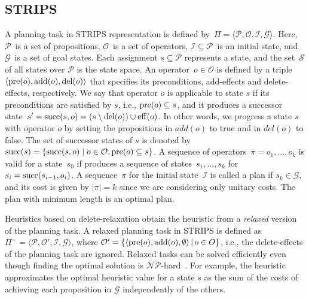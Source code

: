 \documentclass[ppgc,diss,english]{iiufrgs}
\begin{document}
\subsection{STRIPS}
\label{sec:background-strips}
A planning task in STRIPS representation is defined by~$\Pi=\langle\mathcal{P},\mathcal{O},\mathcal{I},\mathcal{G}\rangle$. Here, $\mathcal{P}$~is a set of propositions, $\mathcal{O}$~is a set of operators, $\mathcal{I} \subseteq \mathcal{P}$~is an initial state, and $\mathcal{G}$~is a set of goal states. Each assignment $s \subseteq \mathcal{P}$ represents a state, and the set~$\mathcal{S}$ of all states over $\mathcal{P}$ is the state space.
An operator~$o \in \mathcal{O}$ is defined by a triple~$\langle\operatorname{pre}(o),\operatorname{add}(o),\operatorname{del}(o)\rangle$ that specifies its preconditions, add-effects and delete-effects, respectively. We say that operator $o$ is applicable to state $s$ if its preconditions are satisfied by $s$, i.e., $\operatorname{pre}(o) \subseteq s$, and it produces a successor state~$s' = \operatorname{succ}(s,o) = (s \setminus \operatorname{del}(o)) \cup \operatorname{eff}(o)$. In other words, we progress a state $s$ with operator $o$ by setting the propositions in $add(o)$ to true and in $del(o)$ to false. The set of successor states of $s$ is denoted by~$\operatorname{succ}(s)=\{\operatorname{succ}(s,o)\mid o\in \mathcal{O}, \operatorname{pre}(o) \subseteq s\}$.
A sequence of operators~$\pi=o_1,\ldots,o_k$ is valid for a state~$s_0$ if produces a sequence of states~$s_1,\ldots,s_k$ for $s_i=\operatorname{succ}(s_{i-1},o_i)$. A sequence~$\pi$ for the initial state~$\mathcal{I}$ is called a plan if $s_k \in \mathcal{G}$, and its cost is given by $|\pi| = k$ since we are considering only unitary costs. The plan with minimum length is an optimal plan.

Heuristics based on delete-relaxation obtain the heuristic from a \emph{relaxed} version of the planning task. A relaxed planning task in STRIPS is defined as $\Pi^{+}=\langle\mathcal{P},\mathcal{O'},\mathcal{I},\mathcal{G}\rangle$, where $\mathcal{O'} = \{ \langle \operatorname{pre}(o), \operatorname{add}(o), \emptyset \rangle \,|\, o \in O \}$, i.e., the delete-effects of the planning task are ignored. Relaxed tasks can be solved efficiently even though finding the optimal solution is $\mathcal{NP}$-hard~\cite{Bylander/1994}. For example, the heuristic \hadd approximates the optimal heuristic value for a state $s$ as the sum of the costs of achieving each proposition in $\mathcal{G}$ independently of the others.
\end{document}

